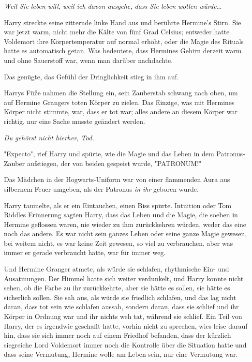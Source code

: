 {\emph{Weil Sie leben will, weil ich davon ausgehe, dass Sie leben wollen würde…}

Harry streckte seine zitternde linke Hand aus und berührte Hermine's Stirn. Sie war jetzt warm, nicht mehr die Kälte von fünf Grad Celsius; entweder hatte Voldemort ihre Körpertemperatur auf normal erhöht, oder die Magie des Rituals hatte es automatisch getan. Was bedeutete, dass Hermines Gehirn derzeit warm und ohne Sauerstoff war, wenn man darüber nachdachte.

Das genügte, das Gefühl der Dringlichkeit stieg in ihm auf.

Harrys Füße nahmen die Stellung ein, sein Zauberstab schwang nach oben, um auf Hermine Grangers toten Körper zu zielen. Das Einzige, was mit Hermines Körper nicht stimmte, war, dass er tot war; alles andere an diesem Körper war richtig, nur eine Sache musste geändert werden.

\emph{Du gehörst nicht hierher, Tod.}

"Expecto", rief Harry und spürte, wie die Magie und das Leben in dem Patronus-Zauber aufstiegen, der von beiden gespeist wurde, "PATRONUM!"

Das Mädchen in der Hogwarts-Uniform war von einer flammenden Aura aus silbernem Feuer umgeben, als der Patronus \emph{in ihr} geboren wurde.

Harry taumelte, als er ein Eintauchen, einen Biss spürte. Intuition oder Tom Riddles Erinnerung sagten Harry, dass das Leben und die Magie, die soeben in Hermine geflossen waren, nie wieder zu ihm zurückkehren würden, weder das eine noch das andere. Es war nicht sein ganzes Leben oder seine ganze Magie gewesen, bei weitem nicht, es war keine Zeit gewesen, so viel zu verbrauchen, aber was immer er gerade verbraucht hatte, war für immer weg.

Und Hermine Granger atmete, als würde sie schlafen, rhythmische Ein- und Ausatmungen. Der Himmel hatte sich weiter verdunkelt, und Harry konnte nicht sehen, ob die Farbe zu ihr zurückkehrte, aber sie hätte es sollen, sie hätte es sicherlich sollen. Sie sah aus, als würde sie friedlich schlafen, und das lag nicht daran, dass tot sein wie schlafen aussah, sondern daran, dass sie schlief und ihr Körper in Ordnung war und ihr nichts weh tat, während sie schlief. Ein Teil von Harry, der es irgendwie geschafft hatte, vorhin nicht zu sprechen, wies leise darauf hin, dass sie sich immer noch auf einem Friedhof befanden, dass der kürzlich siegreiche Lord Voldemort immer noch die Kontrolle über die Situation hatte und dass seine Vermutung, Hermine wolle am Leben sein, nur eine Vermutung war.

}
